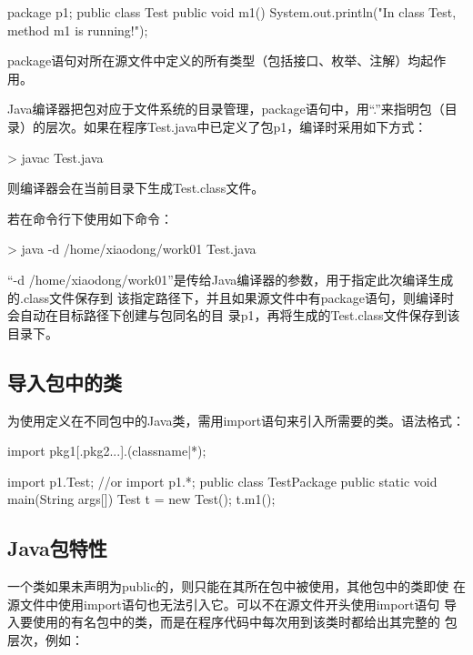
\begin{javaCode}
  package p1;
  public class Test {
    public void m1() {
      System.out.println("In class Test, method m1 is running!");
    }
  }
\end{javaCode}

package语句对所在源文件中定义的所有类型（包括接口、枚举、注解）均起作用。

Java编译器把包对应于文件系统的目录管理，package语句中，用“.”来指明包（目录）的层次。如果在程序Test.java中已定义了包p1，编译时采用如下方式：

\begin{shCode}
  > javac Test.java
\end{shCode}

则编译器会在当前目录下生成Test.class文件。

若在命令行下使用如下命令：

\begin{shCode}
  > java -d /home/xiaodong/work01 Test.java
\end{shCode}

“-d /home/xiaodong/work01”是传给Java编译器的参数，用于指定此次编译生成的.class文件保存到
该指定路径下，并且如果源文件中有package语句，则编译时会自动在目标路径下创建与包同名的目
录p1，再将生成的Test.class文件保存到该目录下。

\subsection{导入包中的类}

为使用定义在不同包中的Java类，需用import语句来引入所需要的类。语法格式：

\begin{javaCode}
  import pkg1[.pkg2...].(classname|*);  
\end{javaCode}


\begin{javaCode}
  import p1.Test; //or import p1.*;
  public class TestPackage{
    public static void main(String args[]){
      Test t = new Test();
      t.m1();
    }
  }
\end{javaCode}

\subsection{Java包特性}

一个类如果未声明为public的，则只能在其所在包中被使用，其他包中的类即使
在源文件中使用import语句也无法引入它。可以不在源文件开头使用import语句
导入要使用的有名包中的类，而是在程序代码中每次用到该类时都给出其完整的
包层次，例如：

